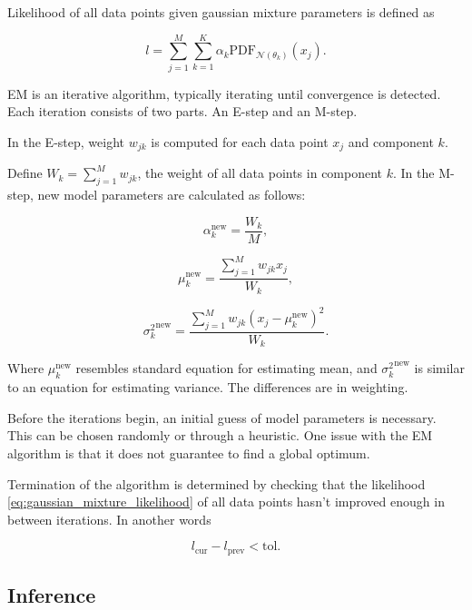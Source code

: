 \documentclass[thesis=B,english]{FITthesis}[2012/06/26]
\begin{document}
Likelihood of all data points given gaussian mixture parameters is defined as

\begin{equation} \label{eq:gaussian_mixture_likelihood}
l = \sum_{j=1}^{M} \sum_{k=1}^{K} \alpha_k \text{PDF}_{\mathcal{N}(\theta_k)}(x_j).
\end{equation}

EM is an iterative algorithm, typically iterating until convergence is detected. Each iteration consists of two parts. An E-step and an M-step.

In the E-step, weight $w_{jk}$ is computed for each data point $x_j$ and component $k$.

Define $W_k = \sum_{j=1}^{M} w_{jk}$, the weight of all data points in component $k$. In the M-step, new model parameters are calculated as follows:

\begin{equation}
\alpha_k^{\text{new}} = \frac{W_k}{M},
\end{equation}

\begin{equation}
\mu_k^{\text{new}} = \frac{\sum_{j=1}^M w_{jk} x_j}{W_k},
\end{equation}

\begin{equation}
{\sigma_k^{2}}^{\text{new}} = \frac{\sum_{j=1}^M w_{jk} (x_j-\mu_k^{\text{new}})^2}{W_k}.
\end{equation}

Where $\mu_k^{\text{new}}$ resembles standard equation for estimating mean, and 
${\sigma_k^{2}}^{\text{new}}$ is similar to an equation for estimating variance. The differences are in weighting.

Before the iterations begin, an initial guess of model parameters is necessary. This can be chosen randomly or through a heuristic. One issue with the EM algorithm is that it does not guarantee to find a global optimum.

Termination of the algorithm is determined by checking that the likelihood \ref{eq:gaussian_mixture_likelihood} of all data points hasn't improved enough in between iterations. In another words

\begin{equation}
l_{\text{cur}} - l_{\text{prev}} < \text{tol}.
\end{equation}

\subsection{Inference}
\end{document}
